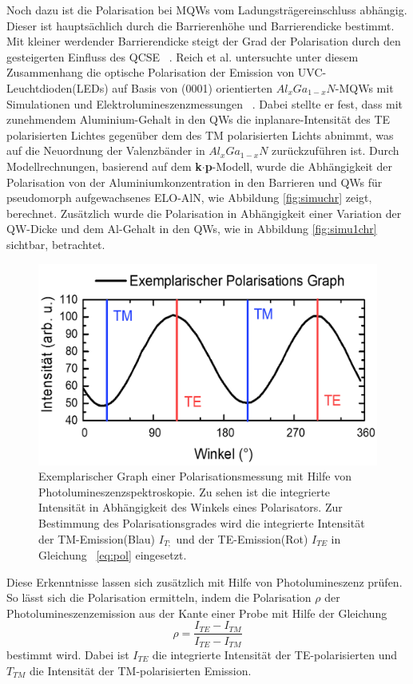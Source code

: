 Noch dazu ist die Polarisation bei MQWs vom Ladungsträgereinschluss abhängig. Dieser ist hauptsächlich durch die Barrierenhöhe und Barrierendicke bestimmt. Mit kleiner werdender Barrierendicke steigt der Grad der Polarisation durch den gesteigerten Einfluss des QCSE ~\cite{PhysRevB.84.035305}. 
\newline
Reich et al. untersuchte unter diesem Zusammenhang die optische Polarisation der Emission von UVC-Leuchtdioden(LEDs) auf Basis von (0001) orientierten $Al_{x}Ga_{1-x}N$-MQWs mit Simulationen und Elektrolumineszenzmessungen ~\cite{doi:10.1063/1.4932651}. Dabei stellte er fest, dass mit zunehmendem Aluminium-Gehalt in den QWs die inplanare-Intensität des TE polarisierten Lichtes gegenüber dem des TM polarisierten Lichts abnimmt, was auf die Neuordnung der Valenzbänder in $Al_{x}Ga_{1-x}N$ zurückzuführen ist. 
\newline
Durch Modellrechnungen, basierend auf dem  \textbf{k$\cdot$p}-Modell, wurde die Abhängigkeit der Polarisation von der Aluminiumkonzentration in den Barrieren und QWs für pseudomorph aufgewachsenes ELO-AlN, wie Abbildung \ref{fig:simuchr} zeigt, berechnet. Zusätzlich wurde die Polarisation in Abhängigkeit einer Variation der QW-Dicke und dem Al-Gehalt in den QWs, wie in Abbildung \ref{fig:simu1chr} sichtbar, betrachtet.
\begin{figure}[ht!]
  \centering
  \begin{minipage}{\linewidth}
      \centering
      \includegraphics[width=0.6\linewidth]{Bilder/exemplPolGraph.png}
      \caption{Exemplarischer Graph einer Polarisationsmessung mit Hilfe von Photolumineszenzspektroskopie. Zu sehen ist die integrierte Intensität in Abhängigkeit des Winkels eines Polarisators. Zur Bestimmung des Polarisationsgrades wird die integrierte Intensität der TM-Emission(Blau) $I_{T;}$  und der TE-Emission(Rot) $I_{TE}$ in Gleichung ~\ref{eq:pol} eingesetzt.}
      \label{fig:degra}
  \end{minipage}
\end{figure}
Diese Erkenntnisse lassen sich zusätzlich mit Hilfe von Photolumineszenz prüfen. So lässt sich die Polarisation ermitteln, indem die Polarisation $\rho$ der Photolumineszenzemission aus der Kante einer Probe mit Hilfe der Gleichung 
\begin{equation}
\rho = \frac{ I_{TE} - I_{TM} }{ I_{TE} - I_{TM} } 
\label{eq:pol}
\end{equation}
bestimmt wird. Dabei ist $I_{TE}$ die integrierte Intensität der TE-polarisierten und $T_{TM}$ die Intensität der TM-polarisierten Emission. 
 



